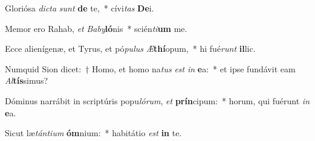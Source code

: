 \item Gloriósa \textit{dic}\textit{ta} \textit{sunt} \textbf{de} te,~* cívi\textit{tas} \textbf{De}i.
\item Memor ero Rahab, \textit{et} \textit{Ba}\textit{by}\textbf{ló}nis~* scién\textit{ti}\textbf{um} me.
\item Ecce alienígenæ, et Tyrus, et pó\textit{pu}\textit{lus} \textit{Æ}\textbf{thí}opum,~* hi fué\textit{runt} \textbf{il}lic.
\item Numquid Sion dicet:~† Homo, et homo na\textit{tus} \textit{est} \textit{in} \textbf{e}a:~* et ipse fundávit eam \textit{Al}\textbf{tís}simus?
\item Dóminus narrábit in scriptúris popu\textit{ló}\textit{rum}, \textit{et} \textbf{prín}cipum:~* horum, qui fuérunt \textit{in} \textbf{e}a.
\item Sicut læ\textit{tán}\textit{ti}\textit{um} \textbf{óm}nium:~* habitátio \textit{est} \textbf{in} te.
